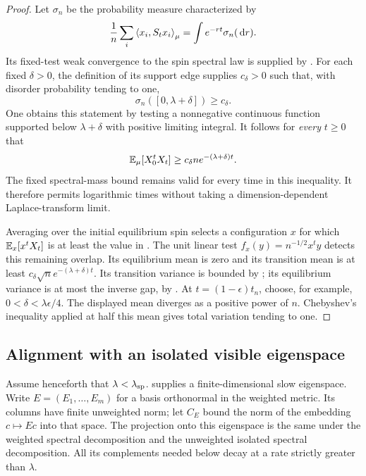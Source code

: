 \begin{proof}
Let $\sigma_n$ be the probability measure characterized by
\[
 \frac1n\sum_i\left\langle x_i,S_tx_i\right\rangle_\mu
       =\int e^{-rt}\sigma_n(\,\mathrm d r).
\]
Its fixed-test weak convergence to the spin spectral law is supplied
by .  For each fixed $\delta>0$, the
definition of its support edge supplies $c_\delta>0$ such that,
with disorder probability tending to one,
\[
 \sigma_n([0,\lambda+\delta])\ge c_\delta.
\]
One obtains this statement by testing a nonnegative continuous
function supported below $\lambda+\delta$ with positive limiting
integral.  It follows for \emph{every} $t\ge0$ that
\begin{equation}
 \mathbb E_\mu[X_0^tX_t]\ge c_\delta n e^{-(\lambda+\delta)t}.
 \label{eq:cutoff-spin-overlap}
\end{equation}
The fixed spectral-mass bound remains valid for every time in this
inequality.  It therefore permits logarithmic times without taking a
dimension-dependent Laplace-transform limit.

Averaging over the initial equilibrium spin selects a configuration $x$
for which $\mathbb E_x[x^tX_t]$ is at least the value in
.  The unit linear test
$f_x(y)=n^{-1/2}x^ty$ detects this remaining overlap.  Its equilibrium mean is zero and its
transition mean is at least
$c_\delta\sqrt n e^{-(\lambda+\delta)t}$.
Its transition variance is bounded by
; its equilibrium variance is at most the
inverse gap, by .  At
$t=(1-\epsilon)t_n$, choose, for example,
$0<\delta<\lambda\epsilon/4$.  The displayed mean diverges as a
positive power of $n$.  Chebyshev's inequality applied at half this
mean gives total variation tending to one.
\end{proof}

\subsection{Alignment with an isolated visible eigenspace}

Assume henceforth that $\lambda<\lambda_{\rm sp}$.
 supplies a finite-dimensional slow
eigenspace.  Write $E=(E_1,\ldots,E_m)$ for a basis orthonormal in
the weighted metric.  Its columns have finite unweighted norm; let
$C_E$ bound the norm of the embedding $c\mapsto Ec$ into that space.
The projection onto this eigenspace is the same under the weighted
spectral decomposition and the unweighted isolated spectral
decomposition.  All its complements needed below decay at a rate
strictly greater than $\lambda$.


